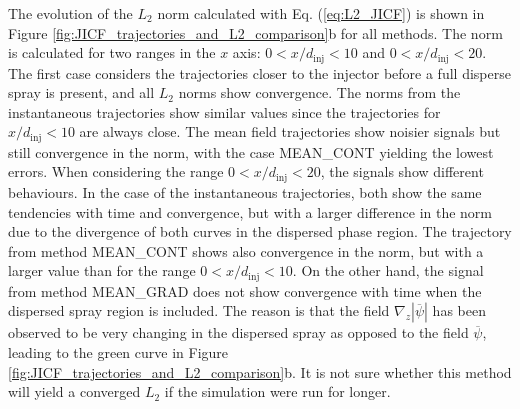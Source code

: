 The evolution of the $L_2$ norm calculated with Eq. (\ref{eq:L2_JICF}) is shown in Figure \ref{fig:JICF_trajectories_and_L2_comparison}b for all methods. The norm is calculated for two ranges in the $x$ axis: $0 < x/d_\mathrm{inj} < 10$ and $0 < x/d_\mathrm{inj} < 20$. The first case considers the trajectories closer to the injector before a full disperse spray is present, and all $L_2$ norms show convergence. The norms from the instantaneous trajectories show similar values since the trajectories for $x/d_\mathrm{inj} < 10$ are always close. The mean field trajectories show noisier signals but still convergence in the norm, with the case MEAN\_CONT yielding the lowest errors. When considering the range $0 < x/d_\mathrm{inj} < 20$, the signals show different behaviours. In the case of the instantaneous trajectories, both show the same tendencies with time and convergence, but with a larger difference in the norm due to the divergence of both curves in the dispersed phase region. The trajectory from method MEAN\_CONT shows also convergence in the norm, but with a larger value than for the range $0 < x/d_\mathrm{inj} < 10$. On the other hand, the signal from method MEAN\_GRAD does not show convergence with time when the dispersed spray region is included. The reason is that the field $\nabla_z | \overline{\psi} |$ has been observed to be very changing in the dispersed spray as opposed to the field $\overline{\psi}$, leading to the green curve in Figure \ref{fig:JICF_trajectories_and_L2_comparison}b. It is not sure whether this method will yield a converged $L_2$ if the simulation were run for longer. 




